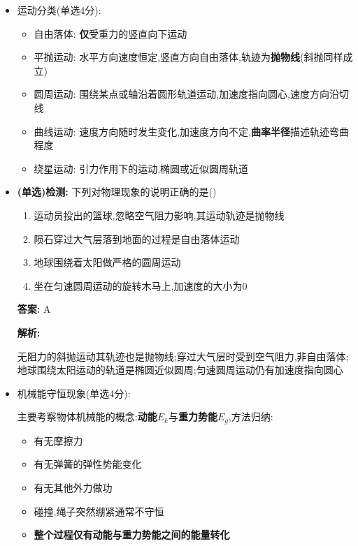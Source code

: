 \documentclass{article}
\begin{document}
\begin{itemize}
        \newpage

    \item 运动分类(单选4分):
          \begin{itemize}
              \item 自由落体: \textbf{仅}受重力的竖直向下运动
              \item 平抛运动: 水平方向速度恒定,竖直方向自由落体,轨迹为\textbf{抛物线}(斜抛同样成立)
              \item 圆周运动: 围绕某点或轴沿着圆形轨道运动,加速度指向圆心,速度方向沿切线
              \item 曲线运动: 速度方向随时发生变化,加速度方向不定,\textbf{曲率半径}描述轨迹弯曲程度
              \item 绕星运动: 引力作用下的运动,椭圆或近似圆周轨道
          \end{itemize}

          \vspace{1em}

    \item[] \textbf{(单选)检测:} 下列对物理现象的说明正确的是(\qquad)

        \begin{enumerate}[label=\Alph*.]
            \item 运动员投出的篮球,忽略空气阻力影响,其运动轨迹是抛物线
            \item 陨石穿过大气层落到地面的过程是自由落体运动
            \item 地球围绕着太阳做严格的圆周运动
            \item 坐在匀速圆周运动的旋转木马上,加速度的大小为0
        \end{enumerate}

        \textbf{答案:} A

        \textbf{解析:}

        \hspace{2em}无阻力的斜抛运动其轨迹也是抛物线;穿过大气层时受到空气阻力,非自由落体;
        地球围绕太阳运动的轨道是椭圆近似圆周;匀速圆周运动仍有加速度指向圆心

        \vspace{2em}

    \item 机械能守恒现象(单选4分):

          \hspace{2em}主要考察物体机械能的概念:\textbf{动能$E_{k}$}与\textbf{重力势能$E_{g}$},方法归纳:
          \begin{itemize}
              \item 有无摩擦力
              \item 有无弹簧的弹性势能变化
              \item 有无其他外力做功
              \item 碰撞,绳子突然绷紧通常不守恒
              \item \textbf{整个过程仅有动能与重力势能之间的能量转化}
          \end{itemize}


\end{itemize}
\end{document}
